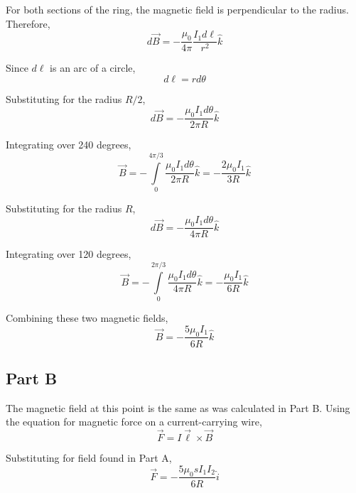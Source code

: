 \documentclass{article}
\begin{document}
For both sections of the ring, the magnetic field is perpendicular to the radius.
Therefore,
$$ d\vec{B} = -\frac{ \mu_{0} }{ 4 \pi } \frac{ I_{1} d\ell }{ r^{2} } \hat{k} $$

Since $d\ell$ is an arc of a circle,
$$ d\ell = r d\theta $$

Substituting for the radius $R/2$,
$$ d\vec{B} = -\frac{ \mu_{0} I_{1} d\theta }{ 2 \pi R } \hat{k} $$

Integrating over 240 degrees,
$$ \vec{B} = -\int\limits_{0}^{4\pi/3} \frac{ \mu_{0} I_{1} d\theta }{ 2 \pi R }
\hat{k} = -\frac{ 2 \mu_{0} I_{1}  }{ 3 R } \hat{k} $$

Substituting for the radius $R$,
$$ d\vec{B} = -\frac{ \mu_{0} I_{1} d\theta }{ 4 \pi R } \hat{k}$$

Integrating over 120 degrees,
$$ \vec{B} = -\int\limits_{0}^{2\pi/3} \frac{ \mu_{0} I_{1} d\theta }{ 4 \pi R }
\hat{k} = - \frac{ \mu_{0} I_{1} }{ 6 R } \hat{k} $$

Combining these two magnetic fields,
$$ \vec{B} = - \frac{ 5 \mu_{0} I_{1} }{ 6 R } \hat{k} $$

\subsection*{Part B}

The magnetic field at this point is the same as was calculated in Part B. Using
the equation for magnetic force on a current-carrying wire,
$$ \vec{F} = I \vec{\ell} \times \vec{B} $$

Substituting for field found in Part A,
$$ \vec{F} = - \frac{ 5 \mu_{0} s I_{1} I_{2} }{ 6 R } \hat{i} $$
\end{document}
